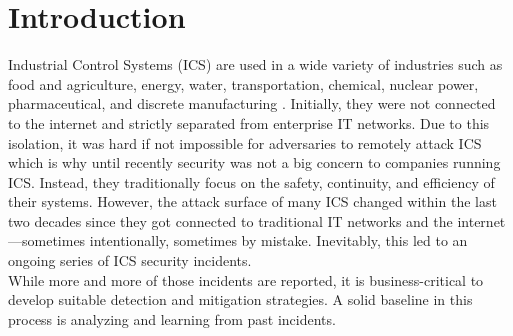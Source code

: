 \documentclass[runningheads]{llncs}
\begin{document}
\section{Introduction}
Industrial Control Systems (ICS) are used in a wide variety of industries such as food and agriculture, energy, water, transportation, chemical, nuclear power, pharmaceutical, and discrete manufacturing \cite{stouffer.2011}.
Initially, they were not connected to the internet and strictly separated from enterprise IT networks.
Due to this isolation, it was hard if not impossible for adversaries to remotely attack ICS which is why until recently security was not a big concern to companies running ICS.
Instead, they traditionally focus on the safety, continuity, and efficiency of their systems.
However, the attack surface of many ICS changed within the last two decades since they got connected to traditional IT networks and the internet---sometimes intentionally, sometimes by mistake.
Inevitably, this led to an ongoing series of ICS security incidents.\\
While more and more of those incidents are reported, it is business-critical to develop suitable detection and mitigation strategies.
A solid baseline in this process is analyzing and learning from past incidents.
\end{document}

